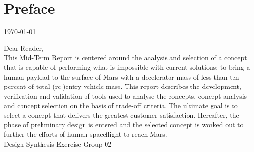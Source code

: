 \section*{Preface}\label{cha:preface}

\begin{flushright}
	\today
\end{flushright}

Dear Reader,	
\\ [1cm]
This Mid-Term Report is centered around the analysis and selection of a concept that is capable of performing what is impossible with current solutions: to bring a human payload to the surface of Mars with a decelerator mass of less than ten percent of total (re-)entry vehicle mass. This report describes the development, verification and validation of tools used to analyse the concepts, concept analysis and concept selection on the basis of trade-off criteria. The ultimate goal is to select a concept that delivers the greatest customer satisfaction. Hereafter, the phase of preliminary design is entered and the selected concept is worked out to further the efforts of human spaceflight to reach Mars.
\\ [1.5cm]
Design Synthesis Exercise Group 02